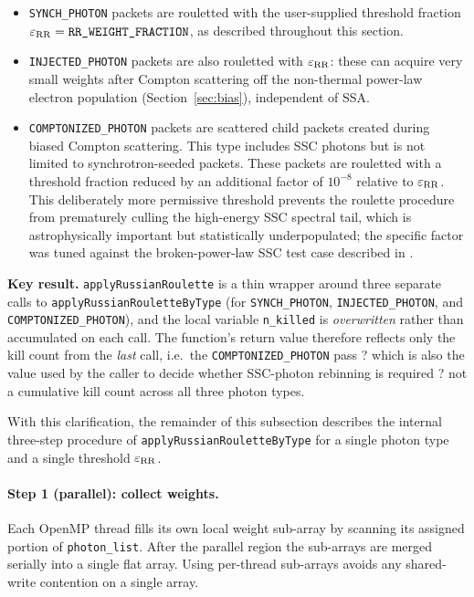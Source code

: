 \documentclass[12pt,a4paper]{article}
\newcommand{\code}[1]{\texttt{#1}}
\newenvironment{keyresult}{%
	\begin{framed}\noindent\textbf{Key result.}\quad}
	{\end{framed}}
\begin{document}
\begin{itemize}
	\item \code{SYNCH\_PHOTON} packets are rouletted with the
	user-supplied threshold fraction $\varepsilon_{\rm RR} =
	\code{RR\_WEIGHT\_FRACTION}$, as described throughout this section.
	\item \code{INJECTED\_PHOTON} packets are also rouletted with
	$\varepsilon_{\rm RR}$: these can acquire very small weights after
	Compton scattering off the non-thermal power-law electron
	population (Section~\ref{sec:bias}), independent of SSA.
	\item \code{COMPTONIZED\_PHOTON} packets are scattered child packets created
	during biased Compton scattering. This type includes SSC photons but is
	not limited to synchrotron-seeded packets. These packets are rouletted with a threshold
	fraction reduced by an additional factor of $10^{-8}$ relative to
	$\varepsilon_{\rm RR}$. This deliberately more permissive threshold
	prevents the roulette procedure from prematurely culling the
	high-energy SSC spectral tail, which is astrophysically important
	but statistically underpopulated; the specific factor was tuned
	against the broken-power-law SSC test case described in
	\citet[Fig.~11]{kawashima2023}.
\end{itemize}

\begin{keyresult}
	\code{applyRussianRoulette} is a thin wrapper
	around three separate calls to \code{applyRussianRouletteByType}
	(for \code{SYNCH\_PHOTON}, \code{INJECTED\_PHOTON}, and
	\code{COMPTONIZED\_PHOTON}), and the local variable \code{n\_killed} is
	\emph{overwritten} rather than accumulated on each call. The function's
	return value therefore reflects only the kill count from the
	\emph{last} call, i.e.\ the \code{COMPTONIZED\_PHOTON} pass ? which is
	also the value used by the caller to decide whether SSC-photon
	rebinning is required ? not a cumulative kill count across all three
	photon types.
\end{keyresult}

With this clarification, the remainder of this subsection describes the
internal three-step procedure of \code{applyRussianRouletteByType} for
a single photon type and a single threshold $\varepsilon_{\rm RR}$.

\paragraph{Step 1 (parallel): collect weights.}
Each OpenMP thread fills its own local weight sub-array by scanning its
assigned portion of \code{photon\_list}.  After the parallel region the
sub-arrays are merged serially into a single flat array.  Using
per-thread sub-arrays avoids any shared-write contention on a single
array.
\end{document}
